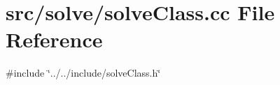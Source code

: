 \section{src/solve/solve\+Class.cc File Reference}
\label{solve_class_8cc}
{\ttfamily \#include \char`\"{}../../include/solve\+Class.\+h\char`\"{}}\newline
